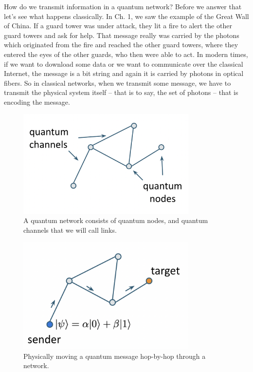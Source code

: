 How do we transmit information in a quantum network? Before we answer that let's see what happens classically. In Ch. 1, we saw the example of the Great Wall of China. If a guard tower was under attack, they lit a fire to alert the other guard towers and ask for help. That message really was carried by the photons which originated from the fire and reached the other guard towers, where they entered the eyes of the other guards, who then were able to act. In modern times, if we want to download some data or we want to communicate over the classical Internet, the message is a bit string and again it is carried by photons in optical fibers. So in classical networks, when we transmit some message, we have to transmit the physical system itself  -- that is to say, the set of photons -- that is encoding the message.
\begin{figure}[H]
    \centering
    \includegraphics[width=0.8\textwidth]{lesson8/quantum-network.png}
        \caption{A quantum network consists of quantum nodes, and quantum channels that we will call links.}
    \label{fig:quantum-network}
\end{figure}
\begin{figure}[H]
    \centering
    \includegraphics[width=0.8\textwidth]{lesson8/hop-by-hop.png}
        \caption{Physically moving a quantum message hop-by-hop through a network.}
    \label{fig:hop-by-hop}
\end{figure}
